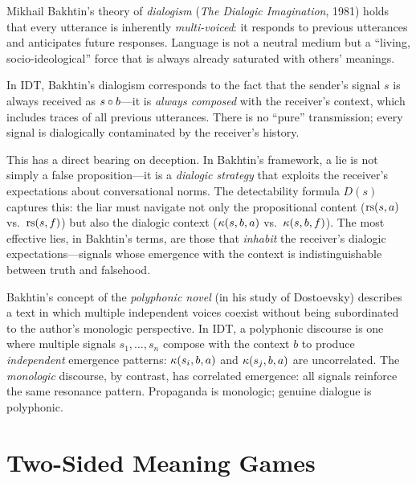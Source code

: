 \begin{interpretation}
Mikhail Bakhtin's theory of \emph{dialogism} (\emph{The Dialogic Imagination},
1981) holds that every utterance is inherently \emph{multi-voiced}: it responds
to previous utterances and anticipates future responses. Language is not a
neutral medium but a ``living, socio-ideological'' force that is always already
saturated with others' meanings.

In IDT, Bakhtin's dialogism corresponds to the fact that the sender's signal
$s$ is always received as $s \circ b$---it is \emph{always composed} with
the receiver's context, which includes traces of all previous utterances.
There is no ``pure'' transmission; every signal is dialogically contaminated
by the receiver's history.

This has a direct bearing on deception. In Bakhtin's framework, a lie is
not simply a false proposition---it is a \emph{dialogic strategy} that
exploits the receiver's expectations about conversational norms. The
detectability formula $D(s)$ captures this: the liar must navigate not
only the propositional content ($\mathrm{rs}(s, a)$ vs.\ $\mathrm{rs}(s, f)$) but also
the dialogic context ($\kappa(s, b, a)$ vs.\ $\kappa(s, b, f)$).
The most effective lies, in Bakhtin's terms, are those that \emph{inhabit}
the receiver's dialogic expectations---signals whose emergence with the
context is indistinguishable between truth and falsehood.

Bakhtin's concept of the \emph{polyphonic novel} (in his study of
Dostoevsky) describes a text in which multiple independent voices coexist
without being subordinated to the author's monologic perspective. In IDT,
a polyphonic discourse is one where multiple signals $s_1, \ldots, s_n$
compose with the context $b$ to produce \emph{independent} emergence
patterns: $\kappa(s_i, b, a)$ and $\kappa(s_j, b, a)$ are uncorrelated.
The \emph{monologic} discourse, by contrast, has correlated emergence:
all signals reinforce the same resonance pattern. Propaganda is monologic;
genuine dialogue is polyphonic.
\end{interpretation}



\chapter{Two-Sided Meaning Games}
\label{ch:two-sided}

